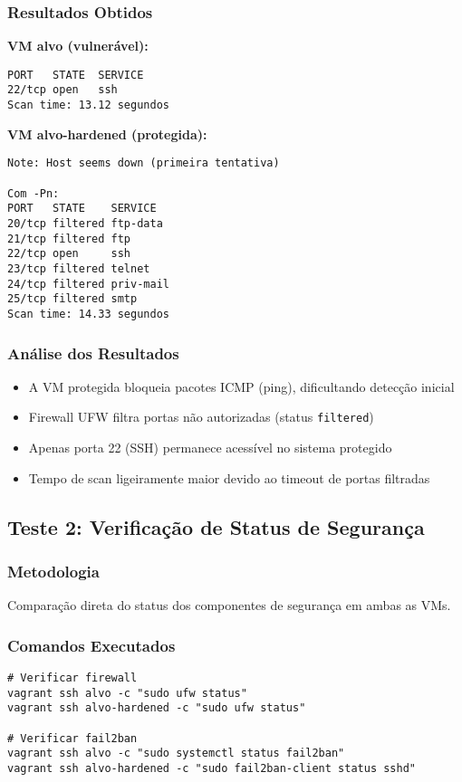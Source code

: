 \documentclass[12pt]{article}
\begin{document}
\subsubsection{Resultados Obtidos}

\textbf{VM alvo (vulnerável):}
\begin{verbatim}
PORT   STATE  SERVICE
22/tcp open   ssh
Scan time: 13.12 segundos
\end{verbatim}

\textbf{VM alvo-hardened (protegida):}
\begin{verbatim}
Note: Host seems down (primeira tentativa)

Com -Pn:
PORT   STATE    SERVICE
20/tcp filtered ftp-data
21/tcp filtered ftp
22/tcp open     ssh
23/tcp filtered telnet
24/tcp filtered priv-mail
25/tcp filtered smtp
Scan time: 14.33 segundos
\end{verbatim}

\subsubsection{Análise dos Resultados}
\begin{itemize}
    \item A VM protegida bloqueia pacotes ICMP (ping), dificultando detecção inicial
    \item Firewall UFW filtra portas não autorizadas (status \texttt{filtered})
    \item Apenas porta 22 (SSH) permanece acessível no sistema protegido
    \item Tempo de scan ligeiramente maior devido ao timeout de portas filtradas
\end{itemize}

\subsection{Teste 2: Verificação de Status de Segurança}

\subsubsection{Metodologia}
Comparação direta do status dos componentes de segurança em ambas as VMs.

\subsubsection{Comandos Executados}
\begin{verbatim}
# Verificar firewall
vagrant ssh alvo -c "sudo ufw status"
vagrant ssh alvo-hardened -c "sudo ufw status"

# Verificar fail2ban
vagrant ssh alvo -c "sudo systemctl status fail2ban"
vagrant ssh alvo-hardened -c "sudo fail2ban-client status sshd"
\end{verbatim}
\end{document}
